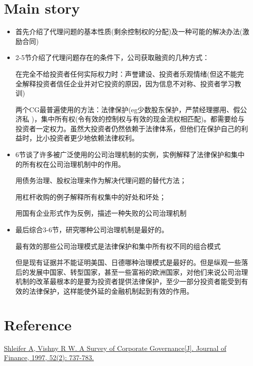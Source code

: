 \documentclass[a4paper]{article}
\begin{document}
\section{Main story}	
	\begin{itemize}
		\item 首先介绍了代理问题的基本性质(剩余控制权的分配)及一种可能的解决办法(激励合同)
		\item 2-5节介绍了代理问题存在的条件下，公司获取融资的几种方式：\par
		在完全不给投资者任何实际权力时：声誉建设、投资者乐观情绪(但这不能完全解释投资者信任企业并对它投资的原因，因为信息不对称、投资者学习教训)\par
		两个CG最普遍使用的方法：法律保护(eg少数股东保护，严禁经理挪用、假公济私
		)，集中所有权(令有效的控制权与有效的现金流权相匹配)。都需要给与投资者一定权力。虽然大投资者仍然依赖于法律体系，但他们在保护自己的利益时，比小投资者更少地依赖法律权利。
		\item 6节谈了许多被广泛使用的公司治理机制的实例，实例解释了法律保护和集中的所有权在公司治理机制中的作用。\par 
		用债务治理、股权治理来作为解决代理问题的替代方法；\par
		用杠杆收购的例子解释所有权集中的好处和坏处；\par
		用国有企业形式作为反例，描述一种失败的公司治理机制
		\item 最后综合3-6节，研究哪种公司治理机制是最好的。\par 
		最有效的那些公司治理模式是法律保护和集中所有权不同的组合模式\par
		但是现有证据并不能证明美国、日德哪种治理模式是最好的。但是纵观一些落后的发展中国家、转型国家，甚至一些富裕的欧洲国家，对他们来说公司治理机制的改革最根本的是要为投资者提供法律保护，至少一部分投资者能受到有效的法律保护，这样能使外延的金融机制起到有效的作用。
	\end{itemize}
	
\section{Reference}
	\href{https://papers.ssrn.com/sol3/papers.cfm?abstract_id=10182\&rec=1\&srcabs=236104\&alg=7\&pos=3}{
	Shleifer A, Vishny R W. A Survey of Corporate Governance[J]. Journal of Finance, 1997, 52(2): 737-783.}
	
\end{document}
